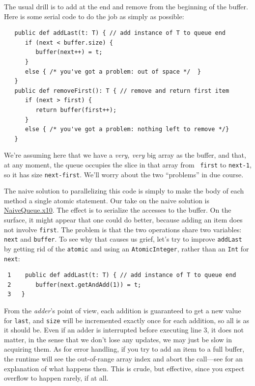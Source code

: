The usual drill is to add at the end and remove from the beginning of the buffer.
Here is some serial code to do the job as simply as possible:
\begin{verbatim}
   public def addLast(t: T) { // add instance of T to queue end
      if (next < buffer.size) {
         buffer(next++) = t;
      }
      else { /* you've got a problem: out of space */  }
   }
   public def removeFirst(): T { // remove and return first item
      if (next > first) {
         return buffer(first++);
      }
      else { /* you've got a problem: nothing left to remove */}
   } 
\end{verbatim}
We're assuming here that we have a {\em very, very} big array as the buffer,
and that, at any moment, the queue occupies the slice in that array from {\tt
first} to {\tt next-1}, so it has size  {\tt next-first}.  We'll
worry about the two ``problems'' in due course.

The naive solution to parallelizing this code is simply to make the body of
each method a single atomic statement.  Our take on the naive solution is
\href{src/concurrency/NaiveQueue.x10}{NaiveQueue.x10}. The effect is to
serialize the accesses to the buffer. On the surface, it might appear that one
could do better, because adding an item does not involve {\tt first}.  The
problem is that the two operations share two variables: {\tt next} and
{\tt buffer}. To see why that causes us grief, let's try to improve
{\tt addLast} by getting rid of the {\tt atomic} and using  an {\tt AtomicInteger},
rather than an {\tt Int} for {\tt next}:

\begin{verbatim}
 1    public def addLast(t: T) { // add instance of T to queue end
 2       buffer(next.getAndAdd(1)) = t;
 3   }
\end{verbatim}

From the {\em adder}'s point of view, each addition is guaranteed to get a new
value for {\tt last}, and {\tt size} will be incremented exactly once for each
addition, so all is as it should be. Even if an adder is interrupted before
executing line 3, it does not matter, in the sense that we don't lose any
updates, we may just be slow in acquiring them.  As for error handling, if you
try to add an item to a full buffer, the \Xten{} runtime will see the
out-of-range array index and abort the call---see  for an
explanation of what happens then. This is crude, but effective, since you
expect overflow to happen rarely, if at all.

